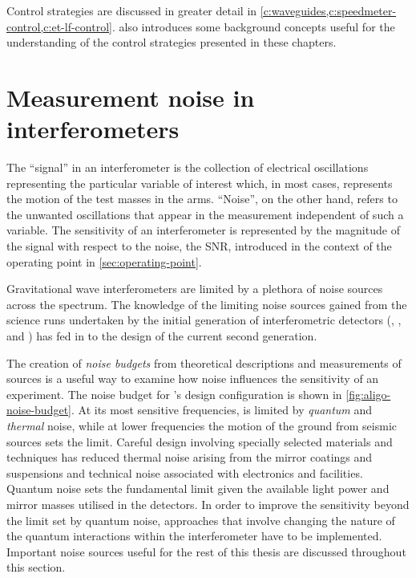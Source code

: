 Control strategies are discussed in greater detail in \cref{c:waveguides,c:speedmeter-control,c:et-lf-control}.  also introduces some background concepts useful for the understanding of the control strategies presented in these chapters.

\section{\label{sec:ifo-noise}Measurement noise in interferometers}
The ``signal'' in an interferometer is the collection of electrical oscillations representing the particular variable of interest which, in most cases, represents the motion of the test masses in the arms. ``Noise'', on the other hand, refers to the unwanted oscillations that appear in the measurement independent of such a variable. The sensitivity of an interferometer is represented by the magnitude of the signal with respect to the noise, the \gls{SNR}, introduced in the context of the operating point in \cref{sec:operating-point}.

Gravitational wave interferometers are limited by a plethora of noise sources across the spectrum. The knowledge of the limiting noise sources gained from the science runs undertaken by the initial generation of interferometric detectors (\LIGO{}, \VIRGO{}, \GEO{} and \TAMA{}) has fed in to the design of the current second generation.

The creation of \emph{noise budgets} from theoretical descriptions and measurements of sources is a useful way to examine how noise influences the sensitivity of an experiment. The noise budget for \ALIGO{}'s design configuration is shown in \cref{fig:aligo-noise-budget}. At its most sensitive frequencies, \ALIGO{} is limited by \emph{quantum} and \emph{thermal} noise, while at lower frequencies the motion of the ground from seismic sources sets the limit. Careful design involving specially selected materials and techniques has reduced thermal noise arising from the mirror coatings and suspensions and technical noise associated with electronics and facilities. Quantum noise sets the fundamental limit given the available light power and mirror masses utilised in the detectors. In order to improve the sensitivity beyond the limit set by quantum noise, approaches that involve changing the nature of the quantum interactions within the interferometer have to be implemented. Important noise sources useful for the rest of this thesis are discussed throughout this section.

